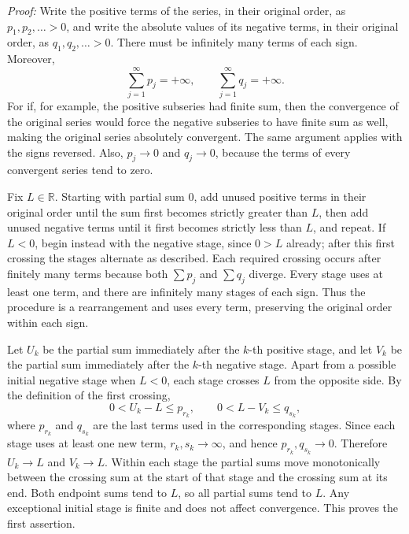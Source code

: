 \documentclass[a4paper,11pt,abstracton]{scrartcl}
\newcommand{\RR}{\mathbb{R}}
\theoremstyle{dotlessP}
\theoremstyle{dotlessS}
\theoremstyle{remark}
\theoremstyle{definition}
\begin{document}
\begin{claim_box}
\textit{Proof:}
Write the positive terms of the series, in their original order, as
$p_1,p_2,\ldots>0$, and write the absolute values of its negative
terms, in their original order, as $q_1,q_2,\ldots>0$. There must be
infinitely many terms of each sign. Moreover,
\[
  \sum_{j=1}^{\infty}p_j=+\infty,
  \qquad
  \sum_{j=1}^{\infty}q_j=+\infty.
\]
For if, for example, the positive subseries had finite sum, then the
convergence of the original series would force the negative subseries
to have finite sum as well, making the original series absolutely
convergent. The same argument applies with the signs reversed.
Also, $p_j\to0$ and $q_j\to0$, because the terms of every convergent
series tend to zero.

Fix $L\in\RR$. Starting with partial sum $0$, add unused positive
terms in their original order until the sum first becomes strictly
greater than $L$, then add unused negative terms until it first becomes
strictly less than $L$, and repeat. If $L<0$, begin instead with the
negative stage, since $0>L$ already; after this first crossing the
stages alternate as described. Each required crossing occurs after
finitely many terms because both $\sum p_j$ and $\sum q_j$ diverge.
Every stage uses at least one term, and there are infinitely many
stages of each sign. Thus the procedure is a rearrangement and uses
every term, preserving the original order within each sign.

Let $U_k$ be the partial sum immediately after the $k$-th positive
stage, and let $V_k$ be the partial sum immediately after the
$k$-th negative stage. Apart from a possible initial negative stage
when $L<0$, each stage crosses $L$ from the opposite side. By the
definition of the first crossing,
\[
  0<U_k-L\le p_{r_k},
  \qquad
  0<L-V_k\le q_{s_k},
\]
where $p_{r_k}$ and $q_{s_k}$ are the last terms used in the
corresponding stages. Since each stage uses at least one new term,
$r_k,s_k\to\infty$, and hence $p_{r_k},q_{s_k}\to0$. Therefore
$U_k\to L$ and $V_k\to L$. Within each stage the partial sums move
monotonically between the crossing sum at the start of that stage and
the crossing sum at its end. Both endpoint sums tend to $L$, so all
partial sums tend to $L$. Any exceptional initial stage is finite and
does not affect convergence. This proves the first assertion.


\end{claim_box}
\end{document}
